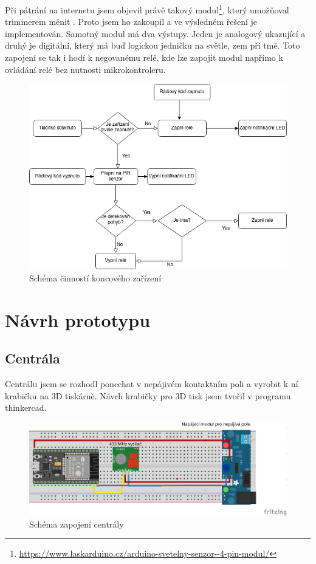 \documentclass[11pt,a4paper,twoside,openright]{report}
\begin{document}
	
	Při pátrání na internetu jsem objevil právě takový modul\footnote{\url{https://www.laskarduino.cz/arduino-svetelny-senzor--4-pin-modul/}}, který umožňoval trimmerem měnit . Proto jsem ho zakoupil a ve výsledném řešení je implementován. Samotný modul má dva výstupy. Jeden je analogový ukazující  a druhý je digitální, který má buď logickou jedničku na světle, zem při tmě. Toto zapojení se tak i hodí k negovanému relé, kde lze zapojit modul napřímo k ovládání relé bez nutnosti mikrokontroleru.
	\begin{figure}[htb]
		\centering
		\includegraphics[width=1\hsize]{img/schema_koncove_zarizeni.png}
		\caption{Schéma činností koncového zařízení}\end{figure}
	
	\section{Návrh prototypu}
	\subsection{Centrála}
	
	Centrálu jsem se rozhodl ponechat v nepájivém kontaktním poli a vyrobit k ní krabičku na 3D tiskárně. Návrh krabičky pro 3D tisk jsem tvořil v programu thinkercad. 
	
	\begin{figure}[htb]
		\centering
		\includegraphics[width=1\hsize]{img/centrala_bb.png}
		\caption{Schéma zapojení centrály}\end{figure}
	
\end{document}
